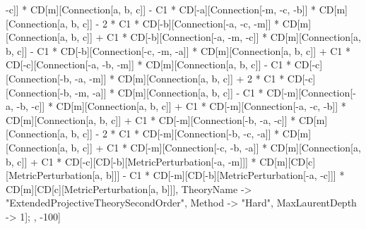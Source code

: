 -c]] * CD[m][Connection[a, b, c]] - C1 * CD[-a][Connection[-m, -c, -b]] * CD[m][Connection[a, b, c]] - 2 * C1 * CD[-b][Connection[-a, -c, -m]] * CD[m][Connection[a, b, c]] + C1 * CD[-b][Connection[-a, -m, -c]] * CD[m][Connection[a, b, c]] - C1 * CD[-b][Connection[-c, -m, -a]] * CD[m][Connection[a, b, c]] + C1 * CD[-c][Connection[-a, -b, -m]] * CD[m][Connection[a, b, c]] - C1 * CD[-c][Connection[-b, -a, -m]] * CD[m][Connection[a, b, c]] + 2 * C1 * CD[-c][Connection[-b, -m, -a]] * CD[m][Connection[a, b, c]] - C1 * CD[-m][Connection[-a, -b, -c]] * CD[m][Connection[a, b, c]] + C1 * CD[-m][Connection[-a, -c, -b]] * CD[m][Connection[a, b, c]] + C1 * CD[-m][Connection[-b, -a, -c]] * CD[m][Connection[a, b, c]] - 2 * C1 * CD[-m][Connection[-b, -c, -a]] * CD[m][Connection[a, b, c]] + C1 * CD[-m][Connection[-c, -b, -a]] * CD[m][Connection[a, b, c]] + C1 * CD[-c][CD[-b][MetricPerturbation[-a, -m]]] * CD[m][CD[c][MetricPerturbation[a, b]]] - C1 * CD[-m][CD[-b][MetricPerturbation[-a, -c]]] * CD[m][CD[c][MetricPerturbation[a, b]]], TheoryName -> "ExtendedProjectiveTheorySecondOrder", Method -> "Hard", MaxLaurentDepth -> 1]; , -100]